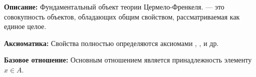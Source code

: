 

\hypertarget{axiom-set}{}
\begin{object} %



\textbf{Описание:}
Фундаментальный объект теории  Цермело-Френкеля.  — это совокупность объектов, обладающих общим свойством, рассматриваемая как единое целое.

\textbf{Аксиоматика:}
Свойства  полностью определяются аксиомами , ,  и др.

\textbf{Базовое отношение:}
Основным отношением является принадлежность элементу $x \in A$.
\end{object}